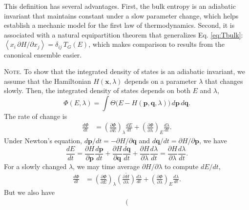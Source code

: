 \documentclass[reprint]{revtex4-1}
\newcommand{\note}[1]{{\color{DarkGreen}\footnotesize \textsc{Note.} #1}}
\begin{document}
This definition has several advantages.
%
First, the bulk entropy is an adiabatic invariant\cite{gibbs,
  hertz1910a, *hertz1910b, munster, becker, cagin1988, rugh2001, adib2002, dunkel2014}
  that maintains constant
  under a slow parameter change,
%
which helps establish a mechanic model
for the first law of thermodynamics.
%
Second, it is associated with a natural equipartition theorem\cite{
  khinchin, dunkel2014}
  that generalizes Eq. \eqref{eq:Tbulk}:
$\left\langle x_i \, \partial H/\partial x_j \right\rangle = \delta_{ij} \, T_G(E)$,
which makes comparison to results from the canonical ensemble easier.

\note{
  To show that
  the integrated density of states
  is an adiabatic invariant,
  we assume that
  the Hamiltonian $H(\mathbf x, \lambda)$
  depends on a parameter $\lambda$
  that changes slowly.
  Then, the integrated density of states
  depends on both $E$ and $\lambda$,
  $$
  \Phi(E, \lambda)
  =
  \int \Theta\bigl(
    E - H(\mathbf p, \mathbf q, \lambda)
  \bigr)
  \, d\mathbf p \, d\mathbf q
  .
  $$
  The rate of change is
  \begin{align*}
  \frac{ d \Phi } { dt }
  &=
  \left(
    \frac{ \partial \Phi } { \partial E }
  \right)_\lambda
  \frac{ dE } { dt }
  +
  \left(
    \frac{ \partial \Phi } { \partial \lambda }
  \right)_E
  \frac{ d\lambda } { dt }
  .
  \end{align*}
  Under Newton's equation,
  $d\mathbf p/dt = -\partial H/\partial \mathbf q$
  and
  $d\mathbf q/dt = \partial H/\partial \mathbf p$,
  we have
  $$
  \frac{ dE } { dt }
  =
  \frac{ \partial H } { \partial \mathbf p }
  \frac{ d \mathbf p } { d t }
  +
  \frac{ \partial H } { \partial \mathbf q }
  \frac{ d \mathbf q } { d t }
  +
  \frac{ \partial H } { \partial \lambda }
  \frac{ d \lambda } { dt }
  =
  \frac{ \partial H } { \partial \lambda }
  \frac{ d \lambda } { dt }
  .
  $$
  For a slowly changed $\lambda$,
  we may time average $\partial H / \partial \lambda$
  to compute $dE/dt$,
  \begin{align*}
  \frac{ d \Phi } { dt }
  &=
  \left(
    \frac{ \partial \Phi } { \partial E }
  \right)_\lambda
  \overline{
    \left(
    \frac{ \partial H } { \partial \lambda }
    \right)
  }
  \frac{ d\lambda } { dt }
  +
  \left(
    \frac{ \partial \Phi } { \partial \lambda }
  \right)_E
  \frac{ d\lambda } { dt }
  .
  \end{align*}
  But we also have
  \begin{align*}
  \left(

\end{align*}}
\end{document}

